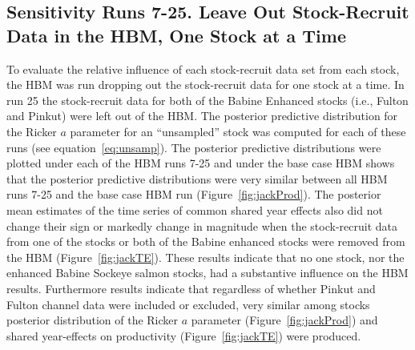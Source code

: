 \documentclass[french,11pt]{book}
\begin{document}
\endgroup{} \endgroup{}

\clearpage

\subsection{Sensitivity Runs 7-25. Leave Out Stock-Recruit Data in the HBM, One Stock at a Time}\label{sensitivity-runs-7-25.-leave-out-stock-recruit-data-in-the-hbm-one-stock-at-a-time}

To evaluate the relative influence of each stock-recruit data set from each stock, the HBM was run dropping out the stock-recruit data for one stock at a time. In run 25 the stock-recruit data for both of the Babine Enhanced stocks (i.e., Fulton and Pinkut) were left out of the HBM. The posterior predictive distribution for the Ricker \(a\) parameter for an ``unsampled'' stock was computed for each of these runs (see equation~\ref{eq:unsamp}). The posterior predictive distributions were plotted under each of the HBM runs 7-25 and under the base case HBM shows that the posterior predictive distributions were very similar between all HBM runs 7-25 and the base case HBM run (Figure~\ref{fig:jackProd}). The posterior mean estimates of the time series of common shared year effects also did not change their sign or markedly change in magnitude when the stock-recruit data from one of the stocks or both of the Babine enhanced stocks were removed from the HBM (Figure~\ref{fig:jackTE}). These results indicate that no one stock, nor the enhanced Babine Sockeye salmon stocks, had a substantive influence on the HBM results. Furthermore results indicate that regardless of whether Pinkut and Fulton channel data were included or excluded, very similar among stocks posterior distribution of the Ricker \(a\) parameter (Figure~\ref{fig:jackProd}) and shared year-effects on productivity (Figure~\ref{fig:jackTE}) were produced.
\end{document}
